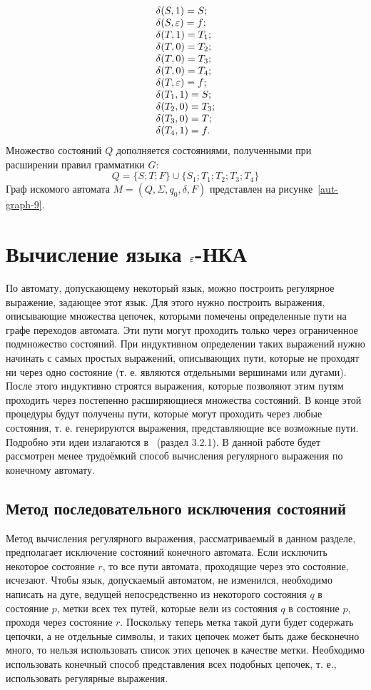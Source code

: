 \begin{myexample}
\[\begin{array}{l}
				\delta(S, 1) = S; \\
				\delta(S, \varepsilon) = f; \\
				\delta(T, 1) = T_1; \\
				\delta(T, 0) = T_2; \\
				\delta(T, 0) = T_3; \\
				\delta(T, 0) = T_4; \\
				\delta(T, \varepsilon) = f; \\
				\delta(T_1, 1) = S; \\
				\delta(T_2, 0) = T_3; \\
				\delta(T_3, 0) = T; \\
				\delta(T_4, 1) = f.
		\end{array}
	\]
	Множество состояний $Q$ дополняется состояниями, полученными при расширении правил грамматики $G$:
	\[
	Q = \{ S; T; F \} \cup \{ S_1; T_1; T_2; T_3; T_4 \}
	\]
	Граф искомого автомата $M = (Q, \Sigma, q_0, \delta, F)$ представлен на рисунке~\ref{aut-graph-9}.
	
\end{myexample}
\section{Вычисление языка $\varepsilon$-НКА}
\label{Chapter4FALang}
По автомату, допускающему некоторый язык, можно построить регулярное выражение, задающее этот язык. Для этого нужно построить выражения, описывающие множества цепочек, которыми помечены определенные пути на графе переходов автомата. Эти пути могут проходить только через ограниченное подмножество состояний. При индуктивном определении таких выражений нужно начинать с самых простых выражений, описывающих пути, которые не проходят ни через одно состояние (т. е. являются отдельными вершинами или дугами). После этого индуктивно строятся выражения, которые позволяют этим путям проходить через постепенно расширяющиеся множества состояний. В конце этой процедуры будут получены пути, которые могут проходить через любые состояния, т. е. генерируются выражения, представляющие все возможные пути. Подробно эти идеи излагаются в~\cite{Hop} (раздел 3.2.1).
В данной работе будет рассмотрен менее трудоёмкий способ вычисления регулярного выражения по конечному автомату.
\subsection*{Метод последовательного исключения состояний}
Метод вычисления регулярного выражения, рассматриваемый в данном разделе, предполагает исключение состояний конечного автомата. Если исключить некоторое состояние $r$, то все пути автомата, проходящие через это состояние, исчезают. Чтобы язык, допускаемый автоматом, не изменился, необходимо написать на дуге, ведущей непосредственно из некоторого состояния $q$ в состояние $p$, метки всех тех путей, которые вели из состояния $q$ в состояние $p$, проходя через состояние $r$. Поскольку теперь метка такой дуги будет содержать цепочки, а не отдельные символы, и таких цепочек может быть даже бесконечно много, то нельзя использовать список этих цепочек в качестве метки. Необходимо использовать конечный способ представления всех подобных цепочек, т. е., использовать регулярные выражения.

